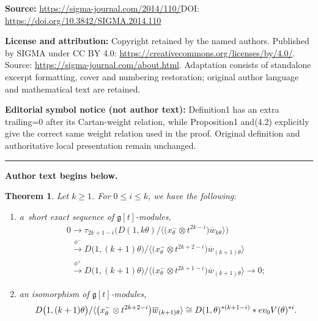 \documentclass[11pt]{article}
\newtheorem{theorem}{Theorem}
\numberwithin{equation}{section}
\begin{document}
\noindent\textbf{Source:} \url{https://sigma-journal.com/2014/110/}\quad DOI: \url{https://doi.org/10.3842/SIGMA.2014.110}\par
\noindent\textbf{License and attribution:} Copyright retained by the named authors. Published by SIGMA under CC BY 4.0: \url{https://creativecommons.org/licenses/by/4.0/}. Source: \url{https://sigma-journal.com/about.html}. Adaptation consists of standalone excerpt formatting, cover and numbering restoration; original author language and mathematical text are retained.\par
\noindent\textbf{Editorial symbol notice (not author text):} Definition1 has an extra trailing=\allowbreak{}0 after its Cartan-weight relation, while Proposition1 and(4.2) explicitly give the correct same weight relation used in the proof. Original definition and authoritative local presentation remain unchanged.\par
\medskip\hrule\medskip\noindent\textbf{Author text begins below.}\par
\setcounter{section}{1}
\setcounter{subsection}{0}
\setcounter{subsubsection}{0}
\setcounter{equation}{0}
\begin{theorem}
\label{MT}
Let $k\geq 1$.
For $0\leq i \leq k$, we have the following:
\begin{enumerate}\itemsep=0pt
\item[$1)$] a~short exact sequence of $\mathfrak{g}[t]$-modules,
\begin{gather*}
0\rightarrow \tau_{2k+1-i} \big(D(1, k\theta)/\big\langle \big(x^{-}_\theta \otimes t^{2k-i}\big) \overline{w}_{k\theta}\big\rangle\big)
\\
\phantom{0}
\xrightarrow{\phi^{-}} D\big(1,(k+1)\theta\big)/\big\langle \big(x^{-}_\theta \otimes t^{2k+2-i}\big) \overline{w}_{(k+1)\theta}\big\rangle
\\
\phantom{0}
\xrightarrow{\phi^+} D\big(1,(k+1)\theta\big)/\big\langle \big(x^{-}_\theta \otimes t^{2k+1-i}\big) \overline{w}_{(k+1)\theta}\big\rangle \rightarrow 0;
\end{gather*}
\item[$2)$] an isomorphism of $\mathfrak{g}[t]$-modules,
\begin{gather*}
D\big(1,(k+1)\theta\big)/\langle \big(x^{-}_\theta \otimes t^{2k+2-i}\big) \overline{w}_{(k+1)\theta}\rangle \cong D(1,\theta)^{* (k+1-i)}* \textup{ev}_0 V(\theta)^{*i}.
\end{gather*}
\end{enumerate}
\end{theorem}
\setcounter{section}{1}
\setcounter{subsection}{0}
\setcounter{subsubsection}{0}
\setcounter{equation}{0}
\end{document}
